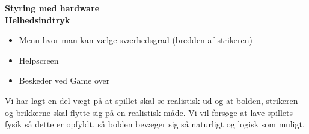 \textbf{Styring med hardware}\\

\textbf{Helhedsindtryk}
\begin{itemize}
\item Menu hvor man kan vælge sværhedsgrad (bredden af strikeren)
\item Helpscreen
\item Beskeder ved Game over
\end{itemize}

Vi har lagt en del vægt på at spillet skal se realistisk ud og at bolden, strikeren og brikkerne skal flytte sig på en realistisk måde. Vi vil forsøge at lave spillets fysik så dette er opfyldt, så bolden bevæger sig så naturligt og logisk som muligt. 
